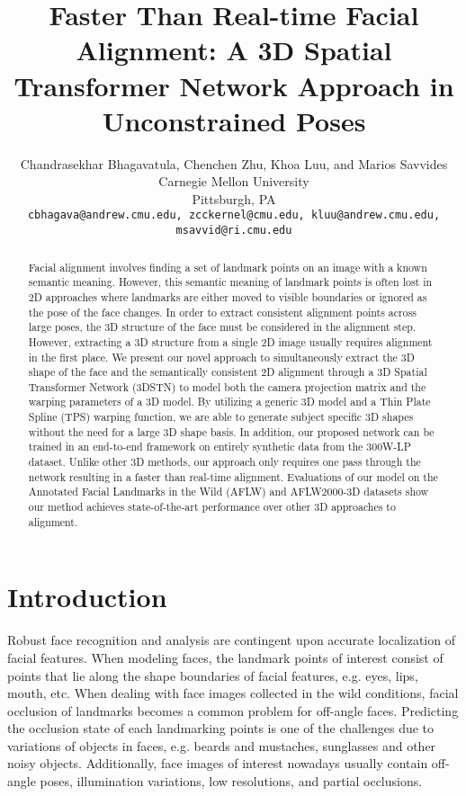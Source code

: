 \documentclass[10pt,twocolumn,letterpaper]{article}
\begin{document}
\title{Faster Than Real-time Facial Alignment: A 3D Spatial Transformer Network Approach in Unconstrained Poses}
\author{Chandrasekhar Bhagavatula, Chenchen Zhu, Khoa Luu, and Marios Savvides\\
Carnegie Mellon University\\
Pittsburgh, PA\\
{\tt\small cbhagava@andrew.cmu.edu, zcckernel@cmu.edu, kluu@andrew.cmu.edu,  msavvid@ri.cmu.edu}
}

\maketitle



\begin{abstract}
Facial alignment involves finding a set of landmark points on an image with a known semantic meaning. However, this semantic meaning of landmark points is often lost in 2D approaches where landmarks are either moved to visible boundaries or ignored as the pose of the face changes. In order to extract consistent alignment points across large poses, the 3D structure of the face must be considered in the alignment step. However, extracting a 3D structure from a single 2D image usually requires alignment in the first place. We present our novel approach to simultaneously extract the 3D shape of the face and the semantically consistent 2D alignment through a 3D Spatial Transformer Network (3DSTN) to model both the camera projection matrix and the warping parameters of a 3D model. By utilizing a generic 3D model and a Thin Plate Spline (TPS) warping function, we are able to generate subject specific 3D shapes without the need for a large 3D shape basis. In addition, our proposed network can be trained in an end-to-end framework on entirely synthetic data from the 300W-LP dataset. Unlike other 3D methods, our approach only requires one pass through the network resulting in a faster than real-time alignment. Evaluations of our model on the Annotated Facial Landmarks in the Wild (AFLW) and AFLW2000-3D datasets show our method achieves state-of-the-art performance over other 3D approaches to alignment.
\end{abstract}

\section{Introduction}

Robust face recognition and analysis are contingent upon accurate localization of facial features.  When modeling faces, the landmark points of interest consist of points that lie along the shape boundaries of facial features, e.g. eyes, lips, mouth, etc. When dealing with face images collected in the wild conditions, facial occlusion of landmarks becomes a common problem for off-angle faces.
Predicting the occlusion state of each landmarking points is one of the challenges due to variations of objects in faces, e.g. beards and mustaches, sunglasses and other noisy objects. Additionally, face images of interest nowadays usually contain off-angle poses, illumination variations, low resolutions, and partial occlusions. 
\end{document}
